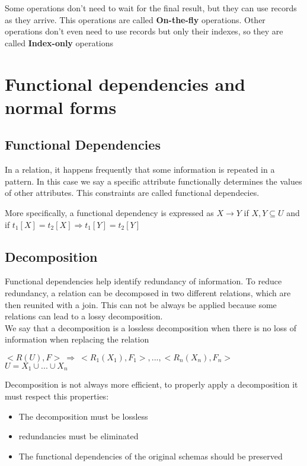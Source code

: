 \documentclass[12pt, a4paper]{article}
\begin{document}
Some operations don't need to wait for the final result, but they can use records as they arrive. This operations are
called \textbf{On-the-fly} operations. Other operations don't even need to use records but only their indexes, so 
they are called \textbf{Index-only} operations


\newpage
\section{Functional dependencies and normal forms}
\subsection{Functional Dependencies}
In a relation, it happens frequently that some information is repeated in a pattern. In this case we say a 
specific attribute functionally determines the values of other attributes. This constraints are called functional 
dependecies.

More specifically, a functional dependency is expressed as $X\to Y$ if $X,Y\subseteq U$ and if 
$t_{1}[X]=t_{2}[X] \Rightarrow t_{1}[Y]=t_{2}[Y]$

\subsection{Decomposition}
Functional dependencies help identify redundancy of information. To reduce redundancy, a relation can be decomposed
in two different relations, which are then reunited with a join. This can not be always be applied because some 
relations can lead to a lossy decomposition.\\We say that a decomposition is a lossless decomposition when there 
is no loss of information when replacing the relation
\begin{center}
    $<R(U),F>\ \Rightarrow\ <R_{1}(X_{1}),F_{1}>,...,<R_{n}(X_{n}),F_{n}>$\\$U=X_{1}\cup ...\cup X_{n}$
\end{center}

Decomposition is not always more efficient, to properly apply a decomposition it must respect this properties:
\begin{itemize}
    \item The decomposition must be lossless
    \item redundancies must be eliminated
    \item The functional dependencies of the original schemas should be preserved
\end{itemize}
\end{document}
